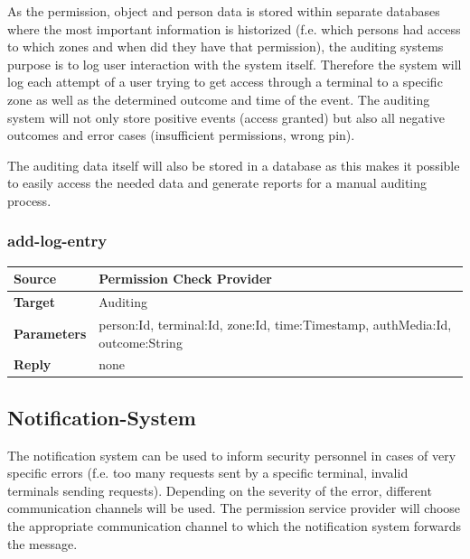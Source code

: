 \documentclass[12pt,a4paper,titlepage,oneside]{scrartcl}
\begin{document}
As the permission, object and person data is stored within separate databases where the most important information is historized (f.e. which persons had access to which zones and when did they have that permission), the auditing systems purpose is to log user interaction with the system itself. Therefore the system will log each attempt of a user trying to get access through a terminal to a specific zone as well as the determined outcome and time of the event. The auditing system will not only store positive events (access granted) but also all negative outcomes and error cases (insufficient permissions, wrong pin).

The auditing data itself will also be stored in a database as this makes it possible to easily access the needed data and generate reports for a manual auditing process.

\subsubsection{add-log-entry}

\begin{table}[h]

    \centering

    \begin{tabular}{|l|p{12cm}|} \hline

    \textbf{Source}&Permission Check Provider\\ \hline

    \textbf{Target}&Auditing\\ \hline

    \textbf{Parameters}&person:Id, terminal:Id, zone:Id, time:Timestamp, authMedia:Id, outcome:String\\ \hline

    \textbf{Reply}&none\\ \hline

    \end{tabular}

\end{table}

\subsection{Notification-System}

The notification system can be used to inform security personnel in cases of very specific errors (f.e. too many requests sent by a specific terminal, invalid terminals sending requests). Depending on the severity of the error, different communication channels will be used. The permission service provider will choose the appropriate communication channel to which the notification system forwards the message.
\end{document}
